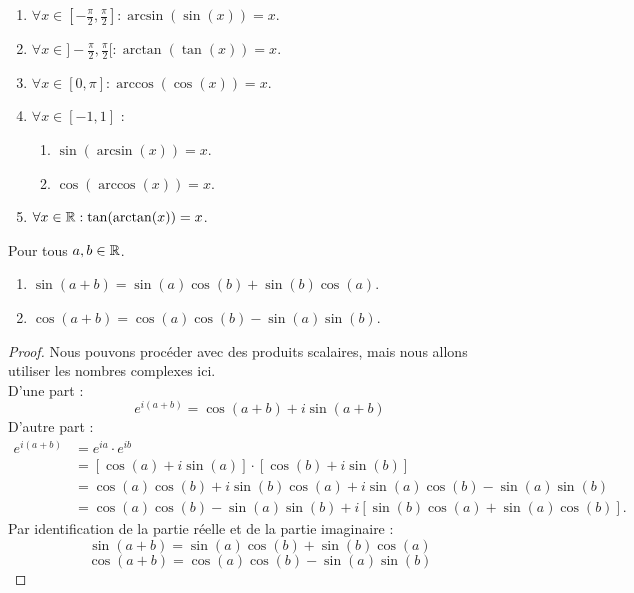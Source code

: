 \begin{proposition}
    \begin{enumerate}
    	\item $\forall x \in [-\frac{\pi}{2}, \frac{\pi}{2}] : \arcsin(\sin(x)) = x$.
        \item $\forall x \in ]-\frac{\pi}{2}, \frac{\pi}{2}[ : \arctan(\tan(x)) = x$.
        \item $\forall x \in [0, \pi] : \arccos(\cos(x)) = x$.
        \item $\forall x \in [-1, 1]$ :
        \begin{enumerate}
            \item $\sin(\arcsin(x)) = x$.
            \item $\cos(\arccos(x)) = x$.
        \end{enumerate}
        \item $\forall x \in \mathbb{R} : \tan(\arctan(x)) = x$.
    \end{enumerate}
\end{proposition}

\begin{proposition}
	Pour tous $a, b \in \mathbb{R}$.
    \begin{enumerate}
        \item $\sin(a + b) = \sin(a) \cos(b) + \sin(b) \cos(a)$.
        \item $\cos(a + b) = \cos(a) \cos(b) - \sin(a) \sin(b)$.
    \end{enumerate}
\end{proposition}

\begin{proof}
    Nous pouvons procéder avec des produits scalaires, mais nous allons utiliser les nombres complexes ici.
    \\
    D'une part :
    \[e^{i (a + b)} = \cos(a + b) + i\sin(a + b)\]
    D'autre part :
    \begin{align*}
        e^{i (a + b)} &= e^{ia} \cdot e^{ib} \\
        &= [\cos(a) + i \sin(a)] \cdot [\cos(b) + i \sin(b)] \\
        &= \cos(a) \cos(b) + i\sin(b)\cos(a) + i\sin(a)\cos(b) - \sin(a)\sin(b) \\
        &= \cos(a)\cos(b) - \sin(a)\sin(b) + i [\sin(b)\cos(a) + \sin(a) \cos(b)].
    \end{align*}
    Par identification de la partie réelle et de la partie imaginaire :
    \[ \sin(a + b) = \sin(a) \cos(b) + \sin(b) \cos(a) \]
	\[ \cos(a + b) = \cos(a) \cos(b) - \sin(a) \sin(b) \]
\end{proof}


